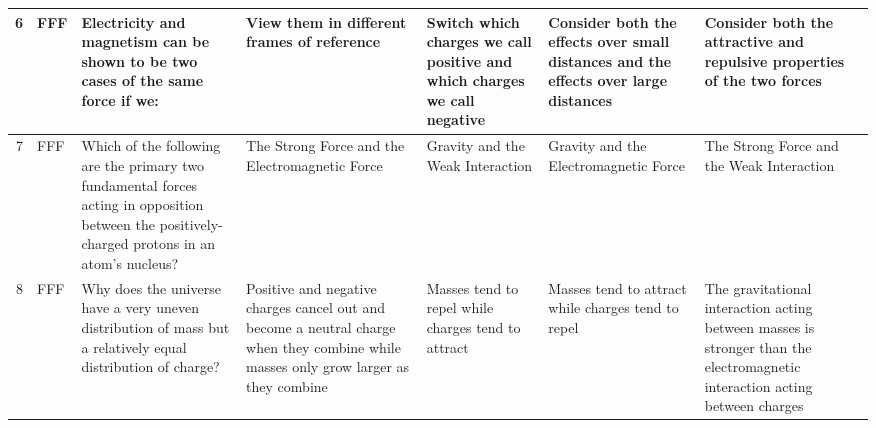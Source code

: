 \documentclass[10pt]{article}
\begin{document}
\begin{tiny}
\begin{longtable}{r|p{0.375in}|p{1.275in}|p{0.75in}|p{0.75in}|p{0.75in}|p{0.75in}}
    6     &     FFF &                                                                                                                                                                                                  Electricity and magnetism can be shown to be two cases of the same force if we: &                                                                                            View them in different frames of reference &                              Switch which charges we call positive and which charges we call negative &                                        Consider both the effects over small distances and the effects over large distances &                                                           Consider both the attractive and repulsive properties of the two forces \\\hline
    7     &     FFF &                                                                                                                                  Which of the following are the primary two fundamental forces acting in opposition between the positively-charged protons in an atom's nucleus? &                                                                                        The Strong Force and the Electromagnetic Force &                                                                      Gravity and the Weak Interaction &                                                                                      Gravity and the Electromagnetic Force &                                                                                         The Strong Force and the Weak Interaction \\\hline
    8     &     FFF &                                                                                                                                                                     Why does the universe have a very uneven distribution of mass but a relatively equal distribution of charge? &  Positive and negative charges cancel out and become a neutral charge when they combine while masses only grow larger as they combine &                                                    Masses tend to repel while charges tend to attract &                                                                         Masses tend to attract while charges tend to repel &       The gravitational interaction acting between masses is stronger than the electromagnetic interaction acting between charges \\\hline

\end{longtable}
\end{tiny}
\end{document}
